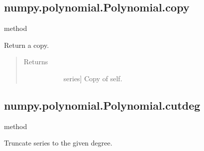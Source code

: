 \documentclass[letterpaper,10pt,english]{sphinxmanual}
\begin{document}
\begin{fulllineitems}
\begin{fulllineitems}
\end{fulllineitems}



\subsection{numpy.polynomial.Polynomial.copy}
\label{\detokenize{generated/generated/numpy.polynomial.Polynomial.copy:numpy-polynomial-polynomial-copy}}\label{\detokenize{generated/generated/numpy.polynomial.Polynomial.copy::doc}}
method

\begin{fulllineitems}
\label{\detokenize{generated/generated/numpy.polynomial.Polynomial.copy:numpy.polynomial.Polynomial.copy}}
Return a copy.
\begin{quote}\begin{description}
\item[{Returns}] \leavevmode\begin{description}
\item[{}] \leavevmode{[}series{]}
Copy of self.

\end{description}

\end{description}\end{quote}

\end{fulllineitems}



\subsection{numpy.polynomial.Polynomial.cutdeg}
\label{\detokenize{generated/generated/numpy.polynomial.Polynomial.cutdeg:numpy-polynomial-polynomial-cutdeg}}\label{\detokenize{generated/generated/numpy.polynomial.Polynomial.cutdeg::doc}}
method

\begin{fulllineitems}
\label{\detokenize{generated/generated/numpy.polynomial.Polynomial.cutdeg:numpy.polynomial.Polynomial.cutdeg}}
Truncate series to the given degree.


\end{fulllineitems}
\end{fulllineitems}
\end{document}
